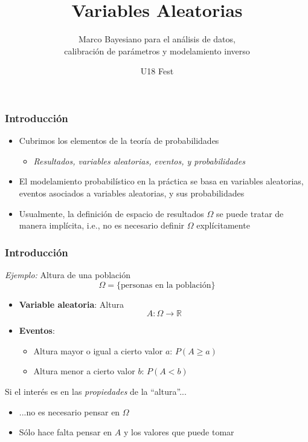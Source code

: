 \documentclass[xcolor=dvipsnames,10pt]{beamer}
\subtitle{Marco Bayesiano para el análisis de datos,\\
  calibración de parámetros y modelamiento inverso}
\title{Variables Aleatorias}%
\institute{Universidad Industrial de Santander}%
\date{U18 Fest}
\begin{document}
\begin{frame}[noframenumbering]
  \titlepage
\end{frame}

\begin{frame}
  \frametitle{Introducción}
  \begin{itemize}
  \item Cubrimos los elementos de la teoría de probabilidades
    \begin{itemize}
    \item \emph{Resultados, variables aleatorias, eventos, y probabilidades}
    \end{itemize}
  \item El modelamiento probabilístico en la práctica se basa en variables aleatorias, eventos asociados a variables aleatorias, y sus probabilidades
  \item Usualmente, la definición de espacio de resultados $\Omega$ se puede tratar de manera implícita, i.e., no es necesario definir $\Omega$ explícitamente
  \end{itemize}
\end{frame}
%
\begin{frame}
  \frametitle{Introducción}
  \emph{Ejemplo:} Altura de una población
  \begin{equation*}
    \Omega = \{ \text{personas en la población} \}
  \end{equation*}
  \begin{itemize}
  \item \textbf{Variable aleatoria}: Altura
    \begin{equation*}
      A \colon \Omega \to \mathbb{R}
    \end{equation*}
  \item \textbf{Eventos}:
    \begin{itemize}
    \item Altura mayor o igual a cierto valor $a$: $P(A \geq a)$
    \item Altura menor a cierto valor $b$: $P(A < b)$
    \end{itemize}
  \end{itemize}
  \pause
  Si el interés es en las \emph{propiedades} de la ``altura''...
  \begin{itemize}
  \item ...no es necesario pensar en $\Omega$
  \item Sólo hace falta pensar en $A$ y los valores que puede tomar
  \end{itemize}
\end{frame}
\end{document}
